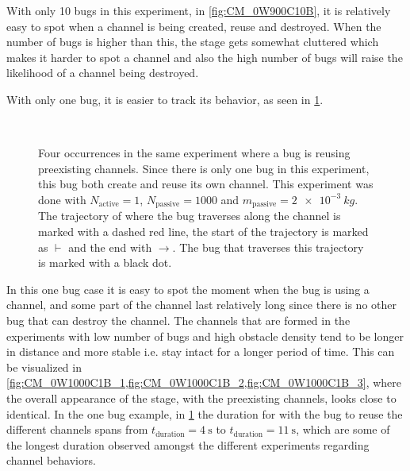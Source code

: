 With only 10 bugs in this experiment, in \cref{fig:CM_0W900C10B}, 
it is relatively easy to spot when a channel is being created, 
reuse and destroyed. When the number of bugs is higher than this, the 
stage gets somewhat cluttered which makes it harder to spot a channel 
and also the high number of bugs will raise the likelihood of a channel being destroyed.

With only one bug, it is easier to track its behavior, as seen in \cref{fig:CM_0W1000C1B}.

\begin{figure}[htpb!]
\centering
{}\quad
{}\\
\quad
{}
\caption{Four occurrences in the same experiment where a bug is reusing preexisting channels. 
Since there is only one bug in this experiment, this bug both create and reuse its own channel.
This experiment was done with $N_{\text{active}}=1$, $N_{\text{passive}}=1000$ and 
$m_{\text{passive}}=\SI{2e-3}{kg}$. The trajectory of where the bug traverses along the 
channel is marked with a dashed red line, the start of the trajectory is marked as $\vdash$ and the 
end with $\rightarrow$. The bug that traverses this trajectory is marked with a black dot.} 
\label{fig:CM_0W1000C1B}
\end{figure}

In this one bug case it is easy to spot the 
moment when the bug is using a channel, 
and some part of the channel last relatively 
long since there is no other bug that can 
destroy the channel. The channels that are 
formed in the experiments with low number of bugs 
and high obstacle density tend to be longer in distance 
and more stable i.e. stay intact for a longer period of time. 
This can be visualized in \cref{fig:CM_0W1000C1B_1,fig:CM_0W1000C1B_2,fig:CM_0W1000C1B_3}, 
where the overall appearance of the stage, with the preexisting channels, looks 
close to identical. In the one bug example, in \cref{fig:CM_0W1000C1B} the duration 
for with the bug to reuse the different channels spans from $t_{\text{duration}}=\SI{4}{\second}$ 
to $t_{\text{duration}}=\SI{11}{\second}$, which are some of the longest duration observed 
amongst the different experiments regarding channel behaviors.

